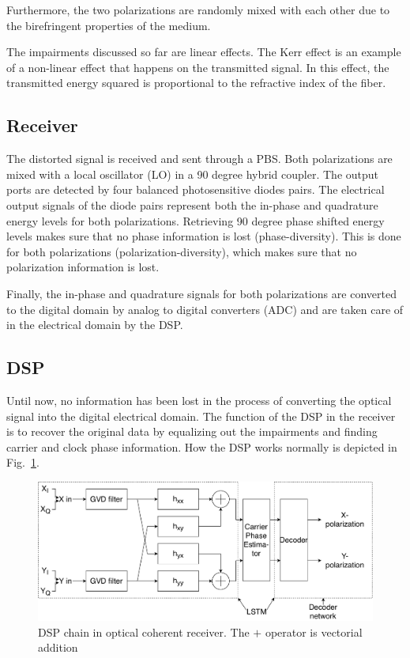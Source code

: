 \documentclass[journal,10pt,twoside, a4paper]{IEEEtran}
\begin{document}
Furthermore, the two polarizations are randomly mixed with each other due to the birefringent properties of the medium\cite{coherent_detection,PMD}.

The impairments discussed so far are linear effects. The Kerr effect is an example of a non-linear effect that happens on the transmitted signal. In this effect, the transmitted energy squared is proportional to the refractive index of the fiber.

\subsection{Receiver}
The distorted signal is received and sent through a PBS. Both polarizations are mixed with a local oscillator (LO) in a 90 degree hybrid coupler. The output ports are detected by four balanced photosensitive diodes pairs. The electrical output signals of the diode pairs represent both the in-phase and quadrature energy levels for both polarizations. Retrieving 90 degree phase shifted energy levels makes sure that no phase information is lost (phase-diversity). This is done for both polarizations (polarization-diversity), which makes sure that no polarization information is lost.

Finally, the in-phase and quadrature signals for both polarizations are converted to the digital domain by analog to digital converters (ADC) and are taken care of in the electrical domain by the DSP.

\subsection{DSP}
Until now, no information has been lost in the process of converting the optical signal into the digital electrical domain. The function of the DSP in the receiver is to recover the original data by equalizing out the impairments and finding carrier and clock phase information. How the DSP works normally is depicted in Fig.~\ref{fig:dsp}.

\begin{figure}
    \centering
    \includegraphics[width=0.9\linewidth]{Thesis/images/DSP.pdf}
    \caption{DSP chain in optical coherent receiver. The \textcircled{$+$} operator is vectorial addition}
    \label{fig:dsp}
\end{figure}
\end{document}

